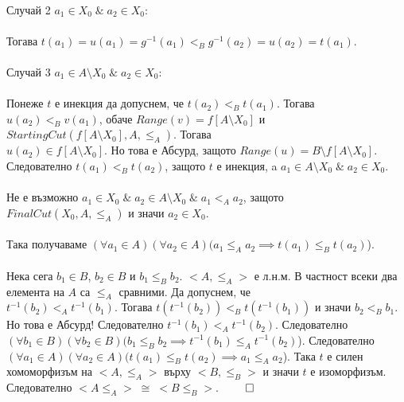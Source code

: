 \documentclass[12pt]{article}
\begin{document}
\\
Случай 2 \(a_1 \in X_0 \; \& \; a_2 \in X_0\):
\\
\vspace{1mm}
\\
Тогава \(t(a_1) = u(a_1) = g^{-1}(a_1) <_B g^{-1}(a_2) = u(a_2) = t(a_1)\).
\\
\vspace{1mm}
\\
Случай 3 \(a_1 \in A \setminus X_0 \; \& \; a_2 \in X_0\):
\\
\vspace{1mm}
\\
Понеже \(t\) е инекция да допуснем, че
\(t(a_2) <_B t(a_1)\).
Тогава \(u(a_2) <_B v(a_1)\),
обаче \(Range(v) = f[A \setminus X_0]\) и \(StartingCut(f[A \setminus X_0], A, \leq_A)\).
Тогава
\\
\(u(a_2) \in f[A \setminus X_0]\).
Но това е Абсурд, защото \(Range(u) = B \setminus f[A \setminus X_0]\).
Следователно \(t(a_1) <_B t(a_2)\), защото \(t\) е инекция, a \(a_1 \in A \setminus X_0 \; \& \; a_2 \in X_0\).
\\
\vspace{1mm}
\\
Не е възможно \(a_1 \in X_0 \; \& \; a_2 \in A \setminus X_0 \; \& \; a_1 <_A a_2\),
защото
\\
\(FinalCut(X_0, A, \leq_A)\) и значи \(a_2 \in X_0\).
\\
\vspace{1mm}
\\
Така получаваме \((\forall a_1 \in A)(\forall a_2 \in A)(a_1 \leq_A a_2 \implies t(a_1) \leq_B t(a_2)\)).
\\
\vspace{1mm}
\\
Нека сега \(b_1 \in B\), \(b_2 \in B\) и \(b_1 \leq_B b_2\).
\(<A, \leq_A>\) е л.н.м. В частност всеки два елемента на \(A\) са \(\leq_A\) сравними.
Да допуснем, че
\\
\(t^{-1}(b_2) <_A t^{-1}(b_1)\).
Тогава \(t(t^{-1}(b_2)) <_B t(t^{-1}(b_1))\) и значи \(b_2 <_B b_1\).
\\
Но това е Абсурд!
Следователно \(t^{-1}(b_1) <_A t^{-1}(b_2)\).
Следователно \\
\((\forall b_1 \in B)(\forall b_2 \in B)(b_1 \leq_B b_2 \implies t^{-1}(b_1) \leq_A t^{-1}(b_2)\)).
Следователно
\((\forall a_1 \in A)(\forall a_2 \in A)(t(a_1) \leq_B t(a_2) \implies a_1 \leq_A a_2\)).
Така \(t\) е силен хомоморфизъм на \(<A, \leq_A>\) върху \(<B, \leq_B>\)
и значи \(t\) е изоморфизъм.
Следователно \(<A \leq_A> \; \cong  \; <B \leq_B>\). \(\qed\)
\end{document}
